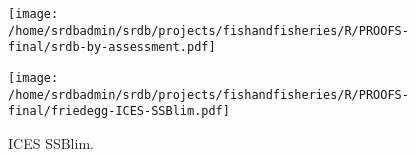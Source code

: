 \documentclass[letterpaper,review,authoryear,12pt]{article}
\begin{document}
\begin{figure}
\begin{center}
\texttt{[image: /home/srdbadmin/srdb/projects/fishandfisheries/R/PROOFS-final/srdb-by-assessment.pdf]} %
\end{center}
\caption{ }\label{fig:taxo:srdb}
\end{figure}


\begin{figure}
\begin{center}
\texttt{[image: /home/srdbadmin/srdb/projects/fishandfisheries/R/PROOFS-final/friedegg-ICES-SSBlim.pdf]}
\end{center}
\caption{ ICES SSBlim.}
\label{fig:icesblim}
\end{figure}


\end{document}
